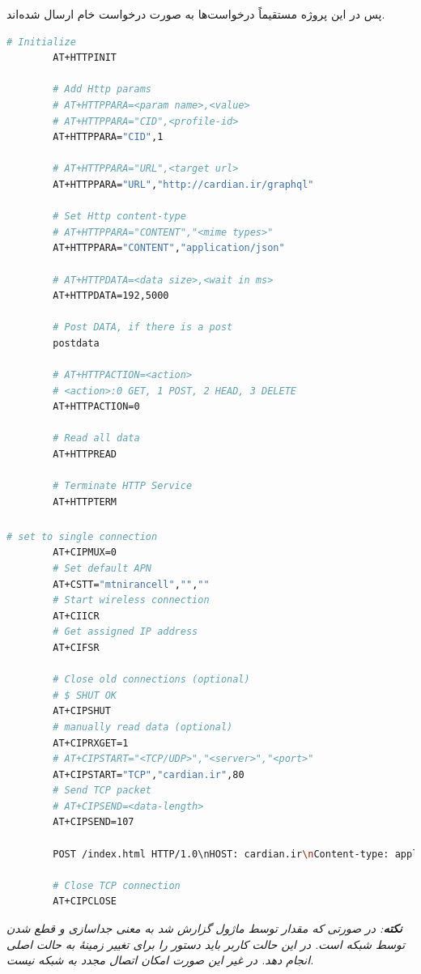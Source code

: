 پس در این پروژه مستقیماً درخواست‌ها به صورت درخواست خام  ارسال شده‌اند.

\begin{latin}
	\small
	\begin{lstlisting}[language=bash,caption={HTTP request}]
		# Initialize
		AT+HTTPINIT

		# Add Http params
		# AT+HTTPPARA=<param name>,<value>
		# AT+HTTPPARA="CID",<profile-id>
		AT+HTTPPARA="CID",1

		# AT+HTTPPARA="URL",<target url>
		AT+HTTPPARA="URL","http://cardian.ir/graphql"

		# Set Http content-type
		# AT+HTTPPARA="CONTENT","<mime types>"
		AT+HTTPPARA="CONTENT","application/json"

		# AT+HTTPDATA=<data size>,<wait in ms>
		AT+HTTPDATA=192,5000

		# Post DATA, if there is a post
		postdata

		# AT+HTTPACTION=<action>
		# <action>:0 GET, 1 POST, 2 HEAD, 3 DELETE
		AT+HTTPACTION=0

		# Read all data
		AT+HTTPREAD

		# Terminate HTTP Service
		AT+HTTPTERM
	\end{lstlisting}
\end{latin}

\subparagraph{ }\label{subpar5:par1:subsubsec1:subsec1:sec2:chap5}
\:\newline\:
\begin{latin}
	\small
	\begin{lstlisting}[language=bash,caption={TCP connection}]
		# set to single connection
		AT+CIPMUX=0
		# Set default APN
		AT+CSTT="mtnirancell","",""
		# Start wireless connection
		AT+CIICR
		# Get assigned IP address
		AT+CIFSR

		# Close old connections (optional)
		# $ SHUT OK
		AT+CIPSHUT
		# manually read data (optional)
		AT+CIPRXGET=1
		# AT+CIPSTART="<TCP/UDP>","<server>","<port>"
		AT+CIPSTART="TCP","cardian.ir",80
		# Send TCP packet
		# AT+CIPSEND=<data-length>
		AT+CIPSEND=107

		POST /index.html HTTP/1.0\nHOST: cardian.ir\nContent-type: application/json\nContent-length: 13\n{"test":true}\n

		# Close TCP connection
		AT+CIPCLOSE
	\end{lstlisting}
\end{latin}

\emph{\textbf{نکته}: در صورتی که مقدار  توسط ماژول گزارش شد به معنی جداسازی و قطع شدن  توسط شبکه است. در این حالت کاربر باید دستور  را برای تغییر زمینهٔ
 به حالت اصلی انجام دهد. در غیر این صورت امکان اتصال مجدد  به شبکه نیست.}
\cite{sim800}

